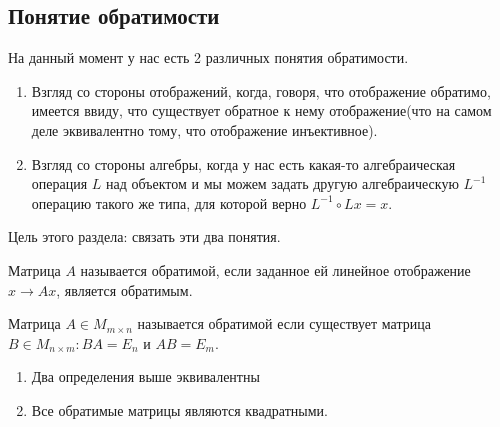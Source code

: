 \subsection{Понятие обратимости}
\begin{motivation}
    На данный момент у нас есть 2 различных понятия обратимости.
    \begin{enumerate}
        \item Взгляд со стороны отображений, когда, говоря, что отображение обратимо,
            имеется ввиду, что существует обратное к нему отображение(что на
            самом деле эквивалентно тому, что отображение инъективное).
        \item Взгляд со стороны алгебры, когда у нас есть какая-то алгебраическая
            операция $L$ над объектом и мы можем задать другую алгебраическую $L^{-1}$
            операцию такого же типа, для которой верно $L^{-1}\circ Lx = x$.
    \end{enumerate}
    Цель этого раздела: связать эти два понятия.
\end{motivation}
\begin{definition}
    Матрица $A$ называется обратимой, если заданное ей линейное отображение $x \rightarrow Ax$, 
    является обратимым.
\end{definition}
\begin{definition}
    Матрица $A\in M_{m\times n}$ называется обратимой если существует матрица 
    $B\in M_{n\times m}\colon BA = E_n \text{ и } AB = E_m$.
\end{definition}
\begin{statement}\leavevmode
    \begin{enumerate}
        \item Два определения выше эквивалентны
        \item Все обратимые матрицы являются квадратными.
    \end{enumerate}
\end{statement}
